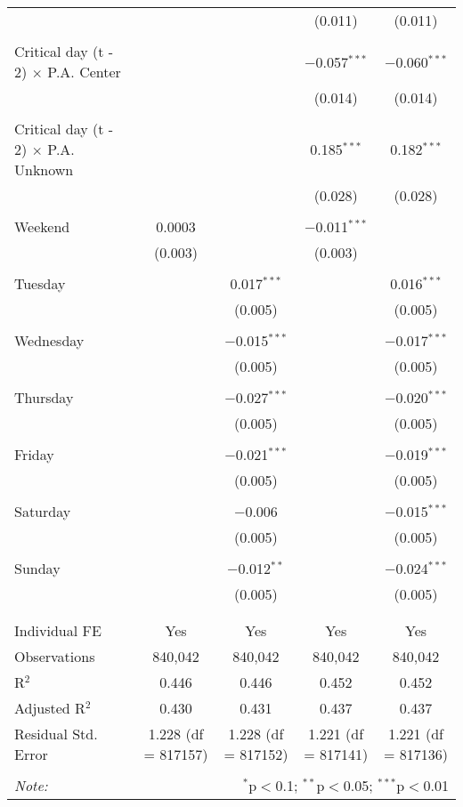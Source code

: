 \documentclass[
]{article}
\begin{document}
\begin{table}[!htbp]
{\begin{tabular}{@{\extracolsep{5pt}}lcccc}
  &  &  & (0.011) & (0.011) \\ 
  & & & & \\ 
 Critical day (t - 2) $\times$ P.A. Center &  &  & $-$0.057$^{***}$ & $-$0.060$^{***}$ \\ 
  &  &  & (0.014) & (0.014) \\ 
  & & & & \\ 
 Critical day (t - 2) $\times$ P.A. Unknown &  &  & 0.185$^{***}$ & 0.182$^{***}$ \\ 
  &  &  & (0.028) & (0.028) \\ 
  & & & & \\ 
 Weekend & 0.0003 &  & $-$0.011$^{***}$ &  \\ 
  & (0.003) &  & (0.003) &  \\ 
  & & & & \\ 
 Tuesday &  & 0.017$^{***}$ &  & 0.016$^{***}$ \\ 
  &  & (0.005) &  & (0.005) \\ 
  & & & & \\ 
 Wednesday &  & $-$0.015$^{***}$ &  & $-$0.017$^{***}$ \\ 
  &  & (0.005) &  & (0.005) \\ 
  & & & & \\ 
 Thursday &  & $-$0.027$^{***}$ &  & $-$0.020$^{***}$ \\ 
  &  & (0.005) &  & (0.005) \\ 
  & & & & \\ 
 Friday &  & $-$0.021$^{***}$ &  & $-$0.019$^{***}$ \\ 
  &  & (0.005) &  & (0.005) \\ 
  & & & & \\ 
 Saturday &  & $-$0.006 &  & $-$0.015$^{***}$ \\ 
  &  & (0.005) &  & (0.005) \\ 
  & & & & \\ 
 Sunday &  & $-$0.012$^{**}$ &  & $-$0.024$^{***}$ \\ 
  &  & (0.005) &  & (0.005) \\ 
  & & & & \\ 
\hline \\[-1.8ex] 
Individual FE & Yes & Yes & Yes & Yes \\ 
Observations & 840,042 & 840,042 & 840,042 & 840,042 \\ 
R$^{2}$ & 0.446 & 0.446 & 0.452 & 0.452 \\ 
Adjusted R$^{2}$ & 0.430 & 0.431 & 0.437 & 0.437 \\ 
Residual Std. Error & 1.228 (df = 817157) & 1.228 (df = 817152) & 1.221 (df = 817141) & 1.221 (df = 817136) \\ 
\hline 
\hline \\[-1.8ex] 
\textit{Note:}  & \multicolumn{4}{r}{$^{*}$p$<$0.1; $^{**}$p$<$0.05; $^{***}$p$<$0.01} \\ 
\end{tabular}
} 
\end{table} 
\newpage
\end{document}

